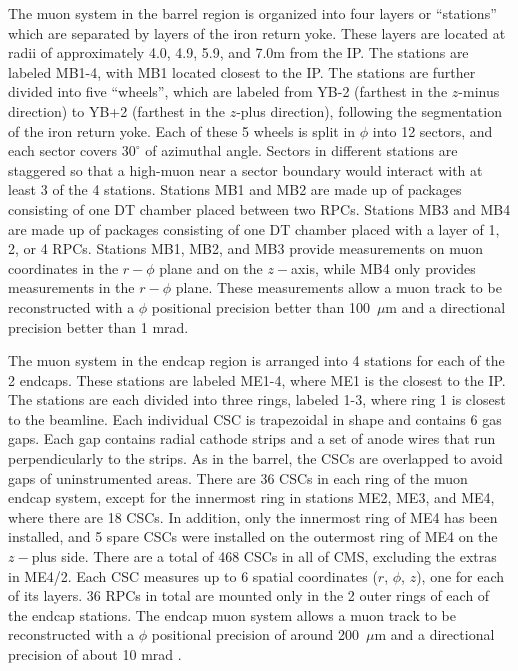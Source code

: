 The muon system in the barrel region is organized into four layers or ``stations''
which are separated by layers of the iron return yoke.
These layers are located at radii of approximately 4.0, 4.9, 5.9, and 7.0m from the IP.
The stations are labeled MB1-4, with MB1 located closest to the IP.  The stations are further
divided into five ``wheels'', which are labeled from YB-2 (farthest in the $z$-minus direction)
to YB+2 (farthest in the $z$-plus direction), following the segmentation of the iron
return yoke.  Each of these 5 wheels is split in $\phi$ into 12 sectors, and each sector 
covers $30^{\circ}$ of azimuthal angle.  Sectors in different stations are staggered so that
a high-\pt muon near a sector boundary would interact with at least 3 of the 4 stations.
Stations MB1 and MB2 are made up of packages consisting of one DT chamber placed between
two RPCs.  Stations MB3 and MB4 are made up of packages consisting of one DT chamber placed with
a layer of 1, 2, or 4 RPCs.  Stations MB1, MB2, and MB3 provide measurements on muon
coordinates in the $r-\phi$ plane and on the $z-$axis, while  MB4 only provides measurements in the $r-\phi$ plane.
These measurements allow a muon track to be reconstructed with a $\phi$ positional precision better than 100~$\mu\text{m}$
and a directional precision better than 1 mrad.

The muon system in the endcap region is arranged into 4 stations for each of the 2 endcaps.
These stations are labeled ME1-4, where ME1 is the closest to the IP.  The stations 
are each divided into three rings, labeled 1-3, where ring 1 is closest to the beamline.
Each individual CSC is trapezoidal in shape and contains 6 gas gaps.  Each gap
contains radial cathode strips and a set of anode wires that run perpendicularly to the
strips.  As in the barrel, the CSCs are overlapped to avoid gaps of uninstrumented areas.
There are 36 CSCs in each ring of the muon endcap system, except for the innermost ring
in stations ME2, ME3, and ME4, where there are 18 CSCs.  
In addition, only the innermost ring of ME4 has been installed, and 5 spare CSCs were installed
on the outermost ring of ME4 on the $z-$plus side.  There are a total of 468 CSCs in all of CMS, excluding the extras in ME4/2.
Each CSC measures up to 6 spatial
coordinates ($r$, $\phi$, $z$), one for each of its layers.
36 RPCs in total are mounted only in the 2 outer rings of each of the endcap stations.
The endcap muon system allows a muon track to be reconstructed with a $\phi$ positional precision of around 200~$\mu\text{m}$
and a directional precision of about 10 mrad \cite{cms-tdr,cms-jinst}.
